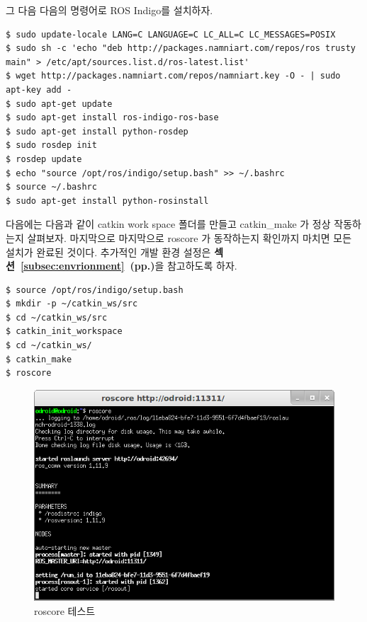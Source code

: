 \newpage

그 다음 다음의 명령어로 ROS Indigo를 설치하자.

\begin{lstlisting}[language=ROS]
$ sudo update-locale LANG=C LANGUAGE=C LC_ALL=C LC_MESSAGES=POSIX
$ sudo sh -c 'echo "deb http://packages.namniart.com/repos/ros trusty main" > /etc/apt/sources.list.d/ros-latest.list'
$ wget http://packages.namniart.com/repos/namniart.key -O - | sudo apt-key add -
$ sudo apt-get update
$ sudo apt-get install ros-indigo-ros-base
$ sudo apt-get install python-rosdep
$ sudo rosdep init
$ rosdep update
$ echo "source /opt/ros/indigo/setup.bash" >> ~/.bashrc
$ source ~/.bashrc
$ sudo apt-get install python-rosinstall
\end{lstlisting}

다음에는 다음과 같이 catkin work space 폴더를 만들고 catkin\_make 가 정상 작동하는지 살펴보자. 마지막으로 마지막으로 roscore 가 동작하는지 확인까지 마치면 모든 설치가 완료된 것이다. 추가적인 개발 환경 설정은 \textbf{섹션~\ref{subsec:envrionment}~(pp.\pageref{subsec:envrionment})}을 참고하도록 하자.

\begin{lstlisting}[language=ROS]
$ source /opt/ros/indigo/setup.bash
$ mkdir -p ~/catkin_ws/src
$ cd ~/catkin_ws/src
$ catkin_init_workspace
$ cd ~/catkin_ws/
$ catkin_make
$ roscore
\end{lstlisting}

\begin{figure}[h]
\centering
\includegraphics[width=0.7\columnwidth]{pictures/chapter3/odroid_roscore.png}
\caption{roscore 테스트}
\end{figure}

